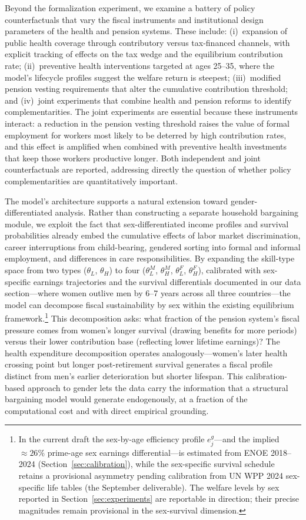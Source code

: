 \documentclass[12pt,a4paper]{article}
\begin{document}
Beyond the formalization experiment, we examine a battery of policy counterfactuals that vary the fiscal instruments and institutional design parameters of the health and pension systems. These include: (i)~expansion of public health coverage through contributory versus tax-financed channels, with explicit tracking of effects on the tax wedge and the equilibrium contribution rate; (ii)~preventive health interventions targeted at ages 25--35, where the model's lifecycle profiles suggest the welfare return is steepest; (iii)~modified pension vesting requirements that alter the cumulative contribution threshold; and (iv)~joint experiments that combine health and pension reforms to identify complementarities. The joint experiments are essential because these instruments interact: a reduction in the pension vesting threshold raises the value of formal employment for workers most likely to be deterred by high contribution rates, and this effect is amplified when combined with preventive health investments that keep those workers productive longer. Both independent and joint counterfactuals are reported, addressing directly the question of whether policy complementarities are quantitatively important.

The model's architecture supports a natural extension toward gender-differentiated analysis. Rather than constructing a separate household bargaining module, we exploit the fact that sex-differentiated income profiles and survival probabilities already embed the cumulative effects of labor market discrimination, career interruptions from child-bearing, gendered sorting into formal and informal employment, and differences in care responsibilities. By expanding the skill-type space from two types ($\theta_L$, $\theta_H$) to four ($\theta_L^M$, $\theta_H^M$, $\theta_L^F$, $\theta_H^F$), calibrated with sex-specific earnings trajectories and the survival differentials documented in our data section---where women outlive men by 6--7 years across all three countries---the model can decompose fiscal sustainability by sex within the existing equilibrium framework.\footnote{In the current draft the sex-by-age efficiency profile $e^g_j$---and the implied $\approx 26\%$ prime-age sex earnings differential---is estimated from ENOE 2018--2024 (Section~\ref{sec:calibration}), while the sex-specific survival schedule retains a provisional asymmetry pending calibration from UN WPP 2024 sex-specific life tables (the September deliverable). The welfare levels by sex reported in Section~\ref{sec:experiments} are reportable in direction; their precise magnitudes remain provisional in the sex-survival dimension.} This decomposition asks: what fraction of the pension system's fiscal pressure comes from women's longer survival (drawing benefits for more periods) versus their lower contribution base (reflecting lower lifetime earnings)? The health expenditure decomposition operates analogously---women's later health crossing point but longer post-retirement survival generates a fiscal profile distinct from men's earlier deterioration but shorter lifespan. This calibration-based approach to gender lets the data carry the information that a structural bargaining model would generate endogenously, at a fraction of the computational cost and with direct empirical grounding.
\end{document}
